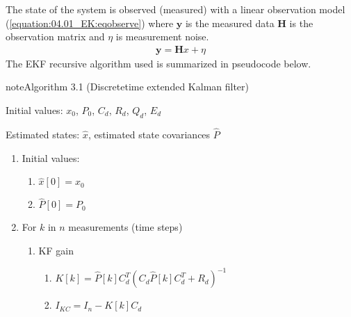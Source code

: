 \documentclass[review]{elsarticle}
\begin{document}
\sphinxAtStartPar
The state of the system is observed (measured) with a linear observation model (\autoref{equation:04.01_EK:eqobserve}) where \(\mathbf{y}\) is the measured data \(\mathbf{H}\) is the observation matrix and \(\eta\) is measurement noise.
\begin{equation}\label{equation:04.01_EK:eqobserve}
\begin{split}\mathbf{y} = \mathbf{H} x + \eta\end{split}
\end{equation}
\sphinxAtStartPar
The EKF recursive algorithm used is summarized in pseudocode below.
\label{04.01_EK:ek-algorithm}
\begin{sphinxadmonition}{note}{Algorithm 3.1 (Discrete\sphinxhyphen{}time extended Kalman filter)}



\sphinxAtStartPar
{} Initial values: \(x_0\), \(P_0\), \(C_d\), \(R_d\), \(Q_d\), \(E_d\)

\sphinxAtStartPar
{} Estimated states: \(\hat{x}\), estimated state covariances \(\hat{P}\)
\begin{enumerate}
%
\item {} 
\sphinxAtStartPar
Initial values:
\begin{enumerate}
%
\item {} 
\sphinxAtStartPar
\(\hat{x}[0] = x_0\)

\item {} 
\sphinxAtStartPar
\(\hat{P}[0] = P_0\)

\end{enumerate}

\item {} 
\sphinxAtStartPar
For \(k\) in \(n\) measurements (time steps)
\begin{enumerate}
%
\item {} 
\sphinxAtStartPar
KF gain
\begin{enumerate}
%
\item {} 
\sphinxAtStartPar
\(K[k]=\hat{P}[k] C_d^T \left(C_d \hat{P}[k] C_d^T + R_d\right)^{-1}\)

\item {} 
\sphinxAtStartPar
\(I_{KC} = I_n - K[k] C_d\)

\end{enumerate}


\end{enumerate}
\end{enumerate}
\end{sphinxadmonition}
\end{document}
